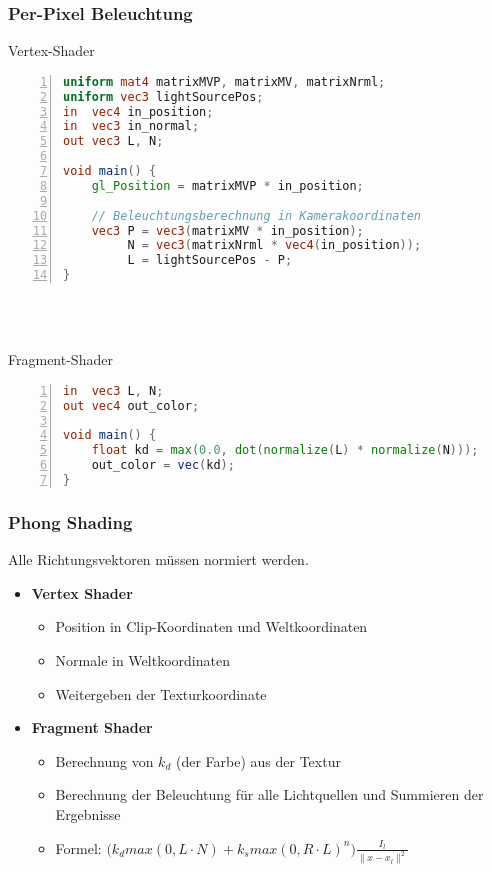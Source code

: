\subsubsection{Per-Pixel Beleuchtung}
\begin{minipage}{\textwidth}
Vertex-Shader
\begin{lstlisting}[frame=single,numbers=left,mathescape,language=GLSL]
uniform mat4 matrixMVP, matrixMV, matrixNrml;
uniform vec3 lightSourcePos;
in  vec4 in_position;
in  vec3 in_normal;
out vec3 L, N;

void main() {
	gl_Position = matrixMVP * in_position;

	// Beleuchtungsberechnung in Kamerakoordinaten
	vec3 P = vec3(matrixMV * in_position);
		 N = vec3(matrixNrml * vec4(in_position));
		 L = lightSourcePos - P;
}
\end{lstlisting}
\end{minipage}
\\\\
\begin{minipage}{\textwidth}
Fragment-Shader
\begin{lstlisting}[frame=single,numbers=left,mathescape,language=GLSL]
in  vec3 L, N;
out vec4 out_color;

void main() {
	float kd = max(0.0, dot(normalize(L) * normalize(N)));
	out_color = vec(kd);
}
\end{lstlisting}
\end{minipage}

\subsubsection{Phong Shading}
Alle Richtungsvektoren müssen normiert werden.
\begin{itemize}
	\item \textbf{Vertex Shader}
	\begin{itemize}
		\item Position in Clip-Koordinaten und Weltkoordinaten
		\item Normale in Weltkoordinaten
		\item Weitergeben der Texturkoordinate
	\end{itemize}
	\item \textbf{Fragment Shader}
	\begin{itemize}
		\item Berechnung von \(k_d\) (der Farbe) aus der Textur
		\item Berechnung der Beleuchtung für alle Lichtquellen und Summieren der Ergebnisse
		\item Formel: \(\Big( k_d max(0,L\cdot N) + k_s max(0,R\cdot L)^n \Big) \frac{I_l}{\|x-x_l\|^2}\)
	\end{itemize}
\end{itemize}
